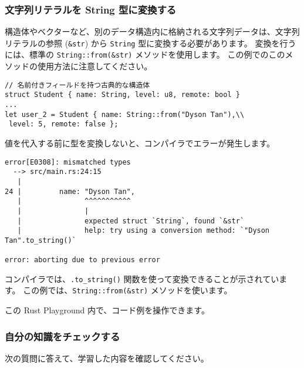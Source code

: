 \subsubsection{文字列リテラルを String 型に変換する}

構造体やベクターなど、別のデータ構造内に格納される文字列データは、文字列リテラルの参照 (\texttt{\&str}) から \texttt{String} 型に変換する必要があります。 変換を行うには、標準の \texttt{String::from(\&str)} メソッドを使用します。 この例でのこのメソッドの使用方法に注意してください。

\begin{lstlisting}[numbers=none]
// 名前付きフィールドを持つ古典的な構造体
struct Student { name: String, level: u8, remote: bool }
...
let user_2 = Student { name: String::from("Dyson Tan"),\\
 level: 5, remote: false };
\end{lstlisting}

値を代入する前に型を変換しないと、コンパイラでエラーが発生します。

\begin{lstlisting}[numbers=none]
error[E0308]: mismatched types
  --> src/main.rs:24:15
   |
24 |         name: "Dyson Tan",
   |               ^^^^^^^^^^^
   |               |
   |               expected struct `String`, found `&str`
   |               help: try using a conversion method: `"Dyson Tan".to_string()`

error: aborting due to previous error
\end{lstlisting}

コンパイラでは、\texttt{.to\_string()} 関数を使って変換できることが示されています。 この例では、\texttt{String::from(\&str)} メソッドを使います。

この Rust Playground 内で、コード例を操作できます。

\subsubsection{自分の知識をチェックする}

次の質問に答えて、学習した内容を確認してください。


